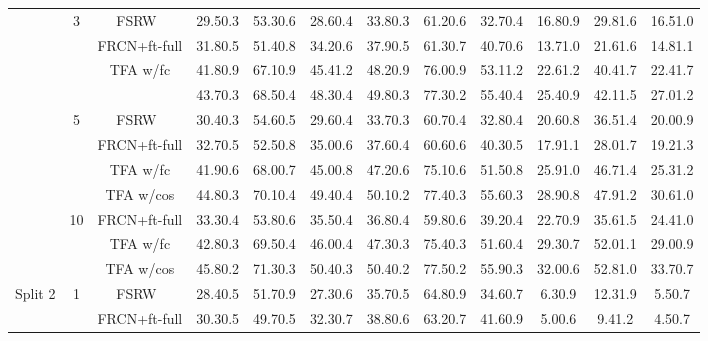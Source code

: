 \documentclass{article}
\newcommand{\model}{TFA\xspace}
\begin{document}
\begin{table*}[!h]
{\begin{tabular}{c|c|c|ccc|ccc|ccc}
    & \multirow{4}{*}{3} & FSRW~\cite{kang2019few} & 29.50.3&53.30.6&28.60.4&33.80.3&61.20.6&32.70.4&16.80.9&29.81.6&16.51.0 \\
    & & FRCN+ft-full & 31.80.5 & 51.40.8 & 34.20.6 & 37.90.5 & 61.30.7 & 40.70.6 & 13.71.0 & 21.61.6 & 14.81.1 \\
    & & {\model w/fc} & 41.80.9 & 67.10.9 & 45.41.2 & 48.20.9 & 76.00.9 & 53.11.2 & 22.61.2 & 40.41.7 & 22.41.7  \\
    & & \cellcolor{Gray}{\model w/cos} &\cellcolor{Gray} 43.70.3 &\cellcolor{Gray} 68.50.4 & \cellcolor{Gray}48.30.4 & \cellcolor{Gray}49.80.3 & \cellcolor{Gray}77.30.2 & \cellcolor{Gray}55.40.4 & \cellcolor{Gray}25.40.9 & \cellcolor{Gray}42.11.5 & \cellcolor{Gray}27.01.2  \\ \cmidrule{2-12}
    & \multirow{4}{*}{5} & FSRW~\cite{kang2019few} & 30.40.3&54.60.5&29.60.4&33.70.3&60.70.4&32.80.4&20.60.8&36.51.4&20.00.9 \\
    & & FRCN+ft-full & 32.70.5 & 52.50.8 & 35.00.6 & 37.60.4 & 60.60.6 & 40.30.5 & 17.91.1 & 28.01.7 & 19.21.3 \\
    & & {\model w/fc} & 41.90.6 & 68.00.7 & 45.00.8 & 47.20.6 & 75.10.6 & 51.50.8 & 25.91.0 & 46.71.4 & 25.31.2  \\
    & &\cellcolor{Gray} {\model w/cos} &\cellcolor{Gray} 44.80.3 & \cellcolor{Gray}70.10.4 &\cellcolor{Gray} 49.40.4 &\cellcolor{Gray} 50.10.2 &\cellcolor{Gray} 77.40.3 &\cellcolor{Gray} 55.60.3 &\cellcolor{Gray} 28.90.8 & \cellcolor{Gray}47.91.2 & \cellcolor{Gray}30.61.0  \\ \cmidrule{2-12}
    & \multirow{3}{*}{10} & FRCN+ft-full & 33.30.4 & 53.80.6 & 35.50.4 & 36.80.4 & 59.80.6 & 39.20.4 & 22.70.9 & 35.61.5 & 24.41.0 \\
    & & {\model w/fc} & 42.80.3 & 69.50.4 & 46.00.4 & 47.30.3 & 75.40.3 & 51.60.4 & 29.30.7 & 52.01.1 & 29.00.9  \\
    & &\cellcolor{Gray} {\model w/cos} & \cellcolor{Gray}45.80.2 & \cellcolor{Gray}71.30.3 & \cellcolor{Gray}50.40.3 &\cellcolor{Gray} 50.40.2 & \cellcolor{Gray}77.50.2 &\cellcolor{Gray} 55.90.3 & \cellcolor{Gray}32.00.6 & \cellcolor{Gray}52.81.0 & \cellcolor{Gray}33.70.7  \\ \midrule
\multirow{21}{*}{Split 2} & \multirow{4}{*}{1} & FSRW~\cite{kang2019few} &
    28.40.5&51.70.9&27.30.6&35.70.5&64.80.9&34.60.7&6.30.9&12.31.9&5.50.7 \\
    & & FRCN+ft-full & 30.30.5 & 49.70.5 & 32.30.7 & 38.80.6 & 63.20.7 & 41.60.9 & 5.00.6 & 9.41.2 & 4.50.7 \\

\end{tabular}}
\end{table*}
\end{document}
